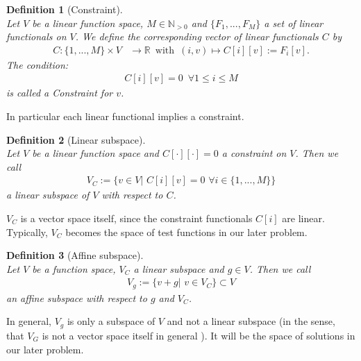 \documentclass[a4paper,11pt]{article}
\numberwithin{equation}{section}
\newtheorem{definition}{Definition}[section]
\newcommand{\theoremNewline}{\hspace{1mm}\\}
\newcommand{\theoremEndLine}{\hspace{1mm}}
\newcommand{\R}{\mathbb{R}}
\begin{document}
    \begin{definition}[Constraint]\theoremNewline
      \label{definition::abstract_concept::constraint}
      Let $V$ be a linear function space, $M \in \mathbb{N}_{>0}$ and $\{ F_1, ..., F_M \}$ a set of linear
      functionals on $V$. We define the corresponding vector of linear functionals $C$ by
      \begin{align}
        C: \{1,...,M\} \times V &\rightarrow \R \enspace \mbox{with} \enspace (i,v) \mapsto C[i][v] := F_i[v].
      \end{align}
      The condition:
        \begin{align}
        C[i][v] = 0 \enspace \forall 1 \le i \le M
        \end{align}
      is called a \textnormal{Constraint} for $v$.
    \end{definition}

    In particular each linear functional implies a constraint.

    \begin{definition}[Linear subspace]\theoremNewline
      \label{definition::abstract_concept::linear_subspace}
      Let $V$ be a linear function space and $C[\cdot][\cdot]=0$ a constraint on $V$. Then we call
      \begin{align}
        V_C := \{ v \in V| \hspace{4pt} C[i][v] = 0 \hspace{4pt}\forall i\in\{1,...,M\}\}
      \end{align}
      a \textnormal{linear subspace} of $V$ with respect to $C$.
    \end{definition}

    $V_C$ is a vector space itself, since the constraint functionals $C[i]$ are linear. Typically, $V_C$ becomes the
    space of test functions in our later problem.

    \begin{definition}[Affine subspace]\theoremNewline
      \label{definition::abstract_concept::affine_space}
      Let $V$ be a function space, $V_C$ a linear subspace and $g \in V$. Then we call
      \begin{align}
        V_{g} := \{ v+g| \hspace{4pt} v \in V_C \} \subset V
      \end{align}
      an \textnormal{affine subspace} with respect to $g$ and $V_C$.
    \end{definition}\theoremEndLine

    In general, $V_g$ is only a subspace of $V$ and not a linear subspace (in the sense, that $V_G$ is not a vector
    space itself in general ). It will be the space of solutions in our later problem.
\end{document}
